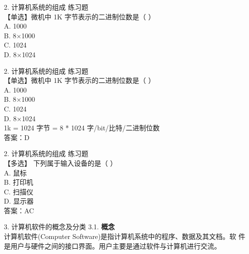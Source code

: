 \documentclass[aspectratio=169]{beamer}
\begin{document}
\begin{frame}[t]{2. 计算机系统的组成} \vspace{20pt}
    练习题\\
    【单选】微机中 1K 字节表示的二进制位数是（ ）\\
A. 1000\\
B. 8×1000\\
C. 1024\\
D. 8×1024\\
\end{frame}



\begin{frame}[t]{2. 计算机系统的组成} \vspace{20pt}
    练习题\\
    【单选】微机中 1K 字节表示的二进制位数是（ ）\\
A. 1000\\
B. 8×1000\\
C. 1024\\
D. 8×1024\\
1k = 1024 字节 = 8 * 1024 字/bit/比特/二进制位数\\
答案：D\\
\end{frame}


\begin{frame}[t]{2. 计算机系统的组成} \vspace{20pt}
    练习题\\
    【多选】 下列属于输入设备的是（ ）\\
    A. 鼠标\\ B. 打印机\\
    C. 扫描仪\\ D. 显示器\\
    答案：AC\\
\end{frame}



\begin{frame}[t]{3. 计算机软件的概念及分类} \vspace{20pt}
    3.1. \textbf{概念}\\
    计算机软件(Computer Software)是指计算机系统中的程序、数据及其文档。软
件是用户与硬件之间的接口界面。用户主要是通过软件与计算机进行交流。
\end{frame}
\end{document}
